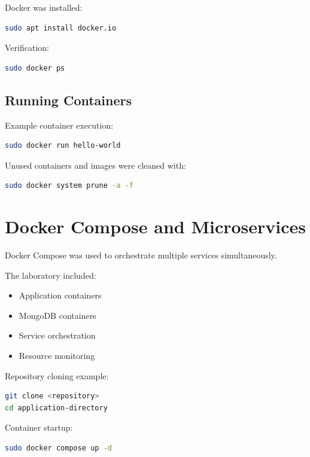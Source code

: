 \documentclass[11pt,a4paper]{article}
\begin{document}
Docker was installed:

\begin{lstlisting}[language=bash]
sudo apt install docker.io
\end{lstlisting}

Verification:

\begin{lstlisting}[language=bash]
sudo docker ps
\end{lstlisting}

\subsection{Running Containers}

Example container execution:

\begin{lstlisting}[language=bash]
sudo docker run hello-world
\end{lstlisting}

Unused containers and images were cleaned with:

\begin{lstlisting}[language=bash]
sudo docker system prune -a -f
\end{lstlisting}

\section{Docker Compose and Microservices}

Docker Compose was used to orchestrate multiple services simultaneously.

The laboratory included:
\begin{itemize}
    \item Application containers
    \item MongoDB containers
    \item Service orchestration
    \item Resource monitoring
\end{itemize}

Repository cloning example:

\begin{lstlisting}[language=bash]
git clone <repository>
cd application-directory
\end{lstlisting}

Container startup:

\begin{lstlisting}[language=bash]
sudo docker compose up -d
\end{lstlisting}
\end{document}
